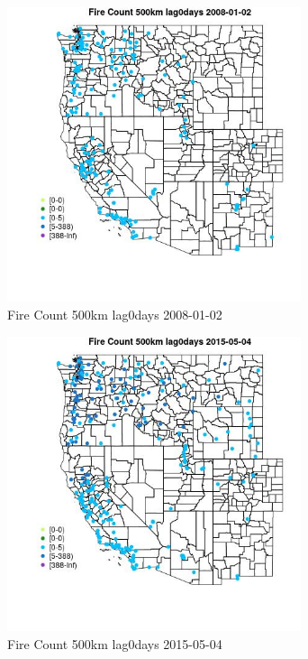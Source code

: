 \begin{figure} 
\centering  
\includegraphics[width=0.77\textwidth]{Code_Outputs/Report_ML_input_PM25_Step4_part_e_de_duplicated_aves_compiled_2019-05-18wNAs_MapObsFire_Count_500km_lag0days2008-01-02.jpg} 
\caption{\label{fig:Report_ML_input_PM25_Step4_part_e_de_duplicated_aves_compiled_2019-05-18wNAsMapObsFire_Count_500km_lag0days2008-01-02}Fire Count 500km lag0days 2008-01-02} 
\end{figure} 
 

\begin{figure} 
\centering  
\includegraphics[width=0.77\textwidth]{Code_Outputs/Report_ML_input_PM25_Step4_part_e_de_duplicated_aves_compiled_2019-05-18wNAs_MapObsFire_Count_500km_lag0days2015-05-04.jpg} 
\caption{\label{fig:Report_ML_input_PM25_Step4_part_e_de_duplicated_aves_compiled_2019-05-18wNAsMapObsFire_Count_500km_lag0days2015-05-04}Fire Count 500km lag0days 2015-05-04} 
\end{figure} 
 

